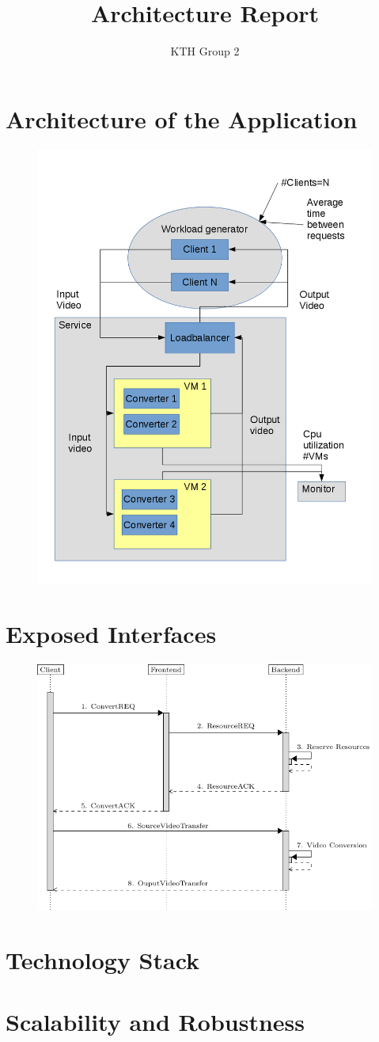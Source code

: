 \documentclass[]{article}
\title{Architecture Report}
\author{KTH Group 2} %
\begin{document}
\maketitle

\section*{Architecture of the Application}
	\begin{figure}[h]
	\centering
	\includegraphics[width=0.7\linewidth]{system_diagram}
	\caption{}
	\label{fig:system_diagram}
	\end{figure}
\section*{Exposed Interfaces}
	\begin{figure}[h]
	\centering
	\includegraphics[width=0.7\linewidth]{sequence_diagram}
	\caption{}
	\label{fig:sequence_diagram}
	\end{figure}
\section*{Technology Stack}
\section*{Scalability and Robustness}
\end{document}
